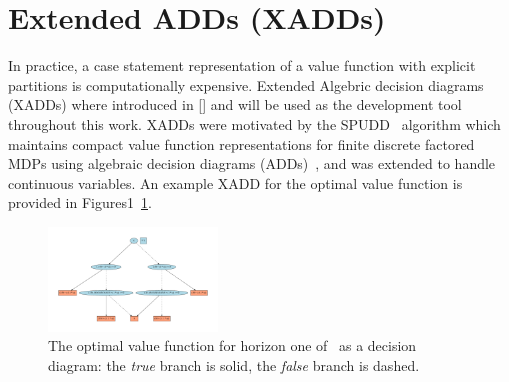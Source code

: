 \documentclass[letterpaper]{article}
\renewcommand{\-}{\text{-}}
\begin{document}
\section{Extended ADDs (XADDs)}

In practice, a case statement representation of a value function with explicit
partitions is computationally expensive.  
Extended Algebric decision diagrams (XADDs) where introduced in [] and will be used 
as the development tool throughout this work. XADDs were motivated by the SPUDD~\cite{spudd} algorithm which
maintains compact value function representations for finite discrete
factored MDPs using algebraic decision diagrams (ADDs)~\cite{bahar93add},
and was extended to handle continuous variables.  An example XADD for the optimal
\InventoryControl value function is provided
in Figures1~\ref{fig:inv_v1}.
\begin{figure}[t]
\begin{center}
\includegraphics[width=0.4\textwidth]{Figures1/inv1.pdf}
\end{center}
\vspace{-3mm}
\caption{%
The optimal value function for horizon one of \InventoryControl\ 
as a decision diagram: 
the \emph{true} branch is solid, the \emph{false}
branch is dashed.} \label{fig:inv_v1}
\vspace{-3mm}
\end{figure}
\end{document}
